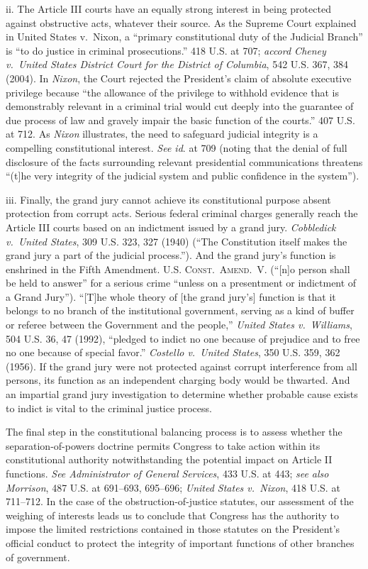 ii. The Article III courts have an equally strong interest in being protected against obstructive acts, whatever their source.
As the Supreme Court explained in United States v.\ Nixon, a “primary constitutional duty of the Judicial Branch” is “to do justice in criminal prosecutions.” 418 U.S. at 707;
\textit{accord Cheney v.\ United States District Court for the District of Columbia}, 542 U.S. 367, 384 (2004).
In \textit{Nixon}, the Court rejected the President’s claim of absolute executive privilege because “the allowance of the privilege to withhold evidence that is demonstrably relevant in a criminal trial would cut deeply into the guarantee of due process of law and gravely impair the basic function of the courts.” 407 U.S. at 712.
As \textit{Nixon} illustrates, the need to safeguard judicial integrity is a compelling constitutional interest.
\textit{See id}. at 709 (noting that the denial of full disclosure of the facts surrounding relevant presidential communications threatens “(t]he very integrity of the judicial system and public confidence in the system”).

iii. Finally, the grand jury cannot achieve its constitutional purpose absent protection from corrupt acts.
Serious federal criminal charges generally reach the Article III courts based on an indictment issued by a grand jury.
\textit{Cobbledick v.\ United States}, 309 U.S. 323, 327 (1940) (“The Constitution itself makes the grand jury a part of the judicial process.”).
And the grand jury’s function is enshrined in the Fifth Amendment.
\textsc{U.S. Const.\ Amend.~V}. (“[n]o person shall be held to answer” for a serious crime “unless on a presentment or indictment of a Grand Jury”).
“[T]he whole theory of [the grand jury’s] function is that it belongs to no branch of the institutional government, serving as a kind of buffer or referee between the Government and the people,” \textit{United States v.\ Williams}, 504 U.S. 36, 47 (1992), “pledged to indict no one because of prejudice and to free no one because of special favor.”
\textit{Costello v.\ United States}, 350 U.S. 359, 362 (1956).
If the grand jury were not protected against corrupt interference from all persons, its function as an independent charging body would be thwarted.
And an impartial grand jury investigation to determine whether probable cause exists to indict is vital to the criminal justice process.

\hr

The final step in the constitutional balancing process is to assess whether the separation-of-powers doctrine permits Congress to take action within its constitutional authority notwithstanding the potential impact on Article II functions.
\textit{See Administrator of General Services}, 433 U.S. at 443;
\textit{see also Morrison}, 487 U.S. at 691--693, 695--696;
\textit{United States v.\ Nixon}, 418 U.S. at 711--712.
In the case of the obstruction-of-justice statutes, our assessment of the weighing of interests leads us to conclude that Congress has the authority to impose the limited restrictions contained in those statutes on the President’s official conduct to protect the integrity of important functions of other branches of government.

